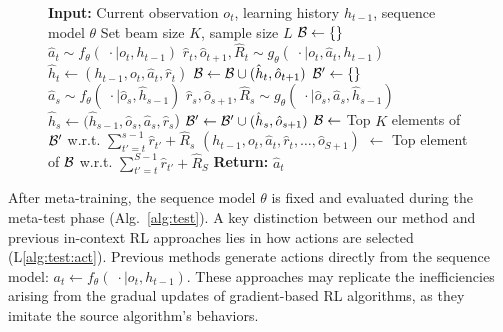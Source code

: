 \documentclass{article}
\begin{document}
\begin{figure}[t]
\begin{minipage}[t!]{0.49\textwidth}
\begin{algorithm}[H]
            \begin{algorithmic}[1]
            \STATE \textbf{Input:} Current observation $o_t$, learning history $h_{t-1}$, sequence model $\theta$
            \STATE Set beam size $K$, sample size $L$
            \STATE ${\mathcal{B}} \gets \{\}$
                \STATE $\hat{a}_t \sim f_\theta(\; \cdot \mid o_t, h_{t-1})$
                \STATE $\hat{r}_t,\hat{o}_{t+1}, \hat{R}_t \sim g_\theta(\; \cdot \mid o_t, \hat{a}_t, h_{t-1})$\label{alg:icp:act1}
                \STATE $\hat{h}_t \gets (h_{t-1}, o_t, \hat{a}_t, \hat{r}_t)$\label{alg:icp:dyn1}
                \STATE ${\mathcal{B}} \gets {\mathcal{B}} \cup (\hat{h}_t,\hat{o}_{t+1})$
            \ENDFOR
            \label{alg:icp:while}
                \STATE ${\mathcal{B}}' \gets \{\}$
                        \STATE $\hat{a}_s \sim f_\theta(\; \cdot \mid \hat{o}_s, \hat{h}_{s-1})$\label{alg:icp:act2}
                        \STATE $\hat{r}_s,\hat{o}_{s+1}, \hat{R}_s \sim g_\theta(\; \cdot \mid \hat{o}_s, \hat{a}_s, \hat{h}_{s-1})$\label{alg:icp:dyn2}
                        \STATE $\hat{h}_s \gets (\hat{h}_{s-1}, \hat{o}_s, \hat{a}_s, \hat{r}_s$)
                        \STATE ${\mathcal{B}}' \gets {\mathcal{B}}' \cup (\hat{h}_s,\hat{o}_{s+1})$
                    \ENDFOR
                \ENDFOR
                \STATE ${\mathcal{B}} \gets$ Top $K$ elements of ${\mathcal{B}}'$ w.r.t. $\sum_{t'=t}^{s-1} \hat{r}_{t'} + \hat{R}_s$\label{alg:icp:topk}
            \ENDWHILE\label{alg:icp:endwhile}
            \STATE $(h_{t-1}, o_t, \hat{a}_t, \hat{r}_t, \dots, \hat{o}_{S+1})$ $\gets$ Top element of ${\mathcal{B}}$ w.r.t. $\sum_{t'=t}^{S-1} \hat{r}_{t'} + \hat{R}_S$\label{alg:icp:top1}
            \STATE \textbf{Return:} $\hat{a}_t$
            \end{algorithmic}
        \end{algorithm}
    \end{minipage}
\end{figure}

After meta-training, the sequence model $\theta$ is fixed and evaluated during the meta-test phase (Alg.~\ref{alg:test}).
A key distinction between our method and previous in-context RL approaches \citep{AD, DPT, IDT} lies in how actions are selected (L\ref{alg:test:act}).
Previous methods generate actions directly from the sequence model: $a_t \gets f_\theta(\; \cdot \mid o_t, h_{t-1})$.
These approaches may replicate the inefficiencies arising from the gradual updates of gradient-based RL algorithms, as they imitate the source algorithm's behaviors.
\end{document}
